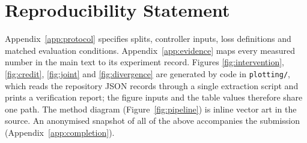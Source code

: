 \documentclass{article}
\begin{document}
\section*{Reproducibility Statement}
Appendix~\ref{app:protocol} specifies splits, controller inputs, loss
definitions and matched evaluation conditions. Appendix~\ref{app:evidence} maps
every measured number in the main text to its experiment record. Figures
\ref{fig:intervention}, \ref{fig:credit}, \ref{fig:joint} and
\ref{fig:divergence} are generated by code in \texttt{plotting/}, which reads
the repository JSON records through a single extraction script and prints a
verification report; the figure inputs and the table values therefore share one
path. The method diagram (Figure~\ref{fig:pipeline}) is inline vector art in the
source. An anonymised snapshot of all of the above accompanies the submission
(Appendix~\ref{app:completion}).
\end{document}
